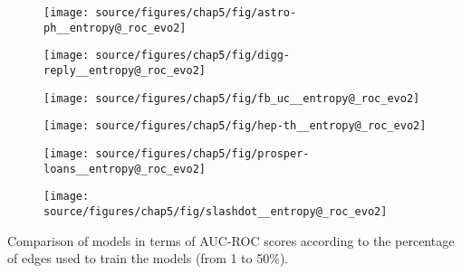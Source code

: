 
\begin{subfigure}
     \centering
         \texttt{[image: source/figures/chap5/fig/astro-ph\_\_entropy@\_roc\_evo2]}
\end{subfigure}
\begin{subfigure}
         \centering
      \texttt{[image: source/figures/chap5/fig/digg-reply\_\_entropy@\_roc\_evo2]}               
\end{subfigure}                                                                          
\begin{subfigure}                                                                        
         \centering                                                                      
      \texttt{[image: source/figures/chap5/fig/fb\_uc\_\_entropy@\_roc\_evo2]}
\end{subfigure}                                                                          
\begin{subfigure}                                                                        
         \centering                                                                      
      \texttt{[image: source/figures/chap5/fig/hep-th\_\_entropy@\_roc\_evo2]}
\end{subfigure}                                                                          
\begin{subfigure}
         \centering
      \texttt{[image: source/figures/chap5/fig/prosper-loans\_\_entropy@\_roc\_evo2]}
\end{subfigure}                                                             
\begin{subfigure}                                                           
         \centering                                                         
      \texttt{[image: source/figures/chap5/fig/slashdot\_\_entropy@\_roc\_evo2]}
\end{subfigure}                                                             
\caption{Comparison of models in terms of AUC-ROC scores according to the percentage of edges used to train the models (from 1 to 50\%).}

